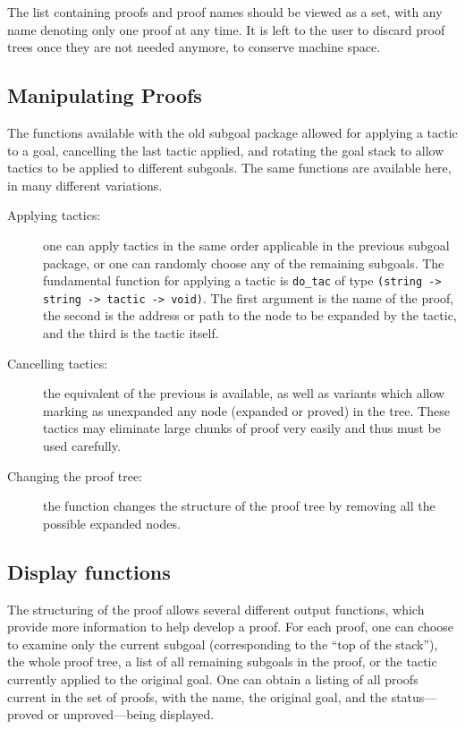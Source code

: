 The list containing proofs and proof names should be viewed as a set,
with any name denoting only one proof at any time. It is left to the
user to discard proof trees once they are not needed anymore, to
conserve machine space.

\subsection{ Manipulating Proofs}

The functions available with the old subgoal package allowed for
applying a tactic to a goal, cancelling the last tactic applied, and
rotating the goal stack to allow tactics to be applied to different
subgoals.  The same functions are available here, in many different
variations.

\begin{description}
\item[ Applying tactics:] one can apply tactics in the same order
applicable in the previous subgoal package, or one can randomly choose
any of the remaining subgoals. The fundamental function for applying a
tactic is \verb|do_tac| of type
\verb|(string -> string -> tactic -> void)|. 
The first argument is the name of the proof, the second
is the address or path to the node to be expanded by the tactic, and
the third is the tactic itself.

\item[ Cancelling tactics:] the equivalent of the previous 
is available, as well as variants which allow marking as unexpanded
any node (expanded or proved) in the tree. These tactics may eliminate
large chunks of proof very easily and thus must be used carefully.

\item[ Changing the proof tree:] the function  changes the
structure of the proof tree by removing all the possible expanded
nodes. 

\end{description}

\subsection{ Display functions}

The structuring of the proof allows several different output
functions, which provide more information to help develop a proof. For
each proof, one can choose to examine only the current subgoal
(corresponding to the ``top of the stack''), the whole proof tree,
a list of all remaining subgoals in the proof, or the tactic currently
applied to the original goal. One can obtain a
listing of all proofs current in the set of proofs, with the name, the
original goal, and the status---proved or unproved---being displayed.


